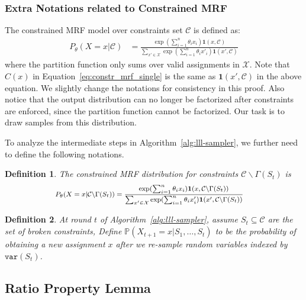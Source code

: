 \documentclass[letterpaper]{article} %
\newtheorem{definition}{Definition}
\newcommand{\var}{\mathtt{var}}
\newcommand{\p}{\mathbb{P}}
\begin{document}
\subsubsection{Extra Notations related to Constrained MRF}
The constrained MRF model over constraints set $\mathcal{C}$ is defined as:
\begin{align*}
P_{\theta}(X=x|\mathcal{C})&=\frac{\exp(\sum_{i=1}^n\theta_i x_i)\mathbf{1}(x,\mathcal{C})}{\sum_{x'\in\mathcal{X}}\exp(\sum_{i=1}^n\theta_i x'_i)\mathbf{1}(x',\mathcal{C})}
\end{align*}
where the partition function only sums over valid assignments in $\mathcal{X}$. Note that $C(x)$ in Equation~\eqref{eq:constr_mrf_single} is the same as $\mathbf{1}(x',\mathcal{C})$ in the above equation. We slightly change the notations for consistency in this proof. Also notice that the output distribution can no longer be factorized after constraints are enforced, since the partition function cannot be factorized. Our task is to draw samples from this distribution. 

To analyze the intermediate steps in Algorithm~\ref{alg:lll-sampler}, we further need to define the following notations.
\begin{definition}  \label{def:general-cmrf}
The constrained MRF distribution for constraints $\mathcal{C}\backslash \Gamma(S_t)$ is
\begin{equation*}\footnotesize
\begin{aligned}
P_{\theta}(X=x|\mathcal{C}\backslash \Gamma(S_t))&=\frac{\exp(\sum_{i=1}^n\theta_i x_i)\mathbf{1}(x,\mathcal{C}\backslash \Gamma(S_t))}{\sum_{x'\in\mathcal{X}}\exp(\sum_{i=1}^n\theta_i x'_i)\mathbf{1}(x',\mathcal{C}\backslash \Gamma(S_t))}
\end{aligned}
\end{equation*}
\end{definition}

\begin{definition}  \label{def:prs-prob}
At round $t$ of Algorithm~\ref{alg:lll-sampler}, assume $S_t\subseteq\mathcal{C}$ are the set of broken constraints,  Define $\p(X_{t+1}=x|S_1,\ldots, S_t)$ to be the probability of obtaining a new assignment $x$ after we re-sample random variables indexed by $\var(S_t)$.
\end{definition}

\subsection{Ratio Property Lemma}
\end{document}
